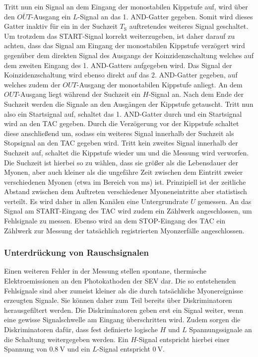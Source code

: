 Tritt nun ein Signal an dem Eingang der monostabilen Kippstufe auf, wird über den $\bar{OUT}$-Ausgang ein $L$-Signal an das 1. AND-Gatter gegeben. Somit wird dieses Gatter inaktiv für ein in der Suchzeit $T_{\mathrm{S}}$ auftretendes weiteres Signal geschaltet. Um trotzdem das START-Signal korrekt weiterzugeben, ist daher darauf zu achten, dass das Signal am Eingang der monostabilen Kippstufe verzögert wird gegenüber dem direkten Signal des Ausgangs der Koinzidenzschaltung welches auf dem zweiten Eingang des 1. AND-Gatters aufgegeben wird.
Das Signal der Koinzidenzschaltung wird ebenso direkt auf das 2. AND-Gatter gegeben, auf welches zudem der $OUT$-Ausgang der monostabilen Kippstufe anliegt. An dem $OUT$-Ausgang liegt während der Suchzeit ein $H$-Signal an.
Nach dem Ende der Suchzeit werden die Signale an den Ausgängen der Kippstufe getauscht.
Tritt nun also ein Startsignal auf, schaltet das 1. AND-Gatter durch und ein Startsignal wird an den TAC gegeben. Durch die Verzögerung vor der Kippstufe schaltet diese anschließend um, sodass ein weiteres Signal innerhalb der Suchzeit als Stopsignal an den TAC gegeben wird.
Tritt kein zweites Signal innerhalb der Suchzeit auf, schaltet die Kippstufe wieder um und die Messung wird verworfen.
Die Suchzeit ist hierbei so zu wählen, dass sie größer als die Lebensdauer der Myonen, aber auch kleiner als die ungefähre Zeit zwischen dem Eintritt zweier verschiedenen Myonen (etwa im Bereich von $\si{\milli\second}$) ist.
Prinzipiell ist der zeitliche Abstand zwischen dem Auftreten verschiedener Myoneneintritte aber statistisch verteilt. Es wird daher in allen Kanälen eine Untergrundrate $U$ gemessen.
An das Signal am START-Eingang des TAC wird zudem ein Zählwerk angeschlossen, um Fehlsignale zu messen.
Ebenso wird an dem STOP-Eingang des TAC ein Zählwerk zur Messung der tatsächlich registrierten Myonzerfälle angeschlossen.
\subsubsection{Unterdrückung von Rauschsignalen}
Einen weiteren Fehler in der Messung stellen spontane, thermische Elektroemissionen an den Photokathoden der SEV dar.
Die so entstehenden Fehlsignale sind aber zumeist kleiner als die durch tatsächliche Myonereignisse erzeugten Signale.
Sie können daher zum Teil bereits über Diskriminatoren herausgefiltert werden.
Die Diskriminatoren geben erst ein Signal weiter, wenn eine gewisse Signalschwelle am Eingang überschritten wird. Zudem sorgen die Diskriminatoren dafür, dass fest definierte logische $H$ und $L$ Spannungssignale an die Schaltung weitergegeben werden. Ein $H$-Signal entspricht hierbei einer Spannung von $\SI{0.8}{\volt}$ und ein $L$-Signal entspricht $\SI{0}{\volt}$.

